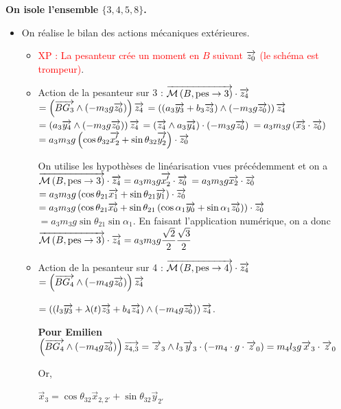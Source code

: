 \documentclass[10pt,fleqn]{article} %
\begin{document}
\textbf{On isole l'ensemble $\{3,4,5,8\}$.}


\begin{itemize}
\item On réalise le bilan des actions mécaniques extérieures. 
\begin{itemize}
\item \textcolor{red}{ XP : La pesanteur crée un moment en $B$ suivant  $\overrightarrow{z_0}$ (le schéma est trompeur)}.
\item Action de la pesanteur sur 3 : 
$\overrightarrow{\mathcal{M}\left( {B}, {\text{pes}} \rightarrow {3}\right)}\cdot \overrightarrow{z_4} $ $ =\left(\overrightarrow{BG_3}\wedge \left(-m_3g \overrightarrow{z_0}\right) \right)\overrightarrow{z_4}$ 
$ =\left(\left( a_3\overrightarrow{y_3} + b_3\overrightarrow{z_3}  \right)\wedge \left(-m_3g \overrightarrow{z_0}\right)\right)\overrightarrow{z_4}$
$ =\left( a_3\overrightarrow{y_4} \wedge \left(-m_3g \overrightarrow{z_0}\right)\right)\overrightarrow{z_4}$
$ =\left( \overrightarrow{z_4} \wedge a_3\overrightarrow{y_4}\right)\cdot  \left(-m_3g \overrightarrow{z_0}\right)$
$ = a_3 m_3g \left( \overrightarrow{x_3}\cdot \overrightarrow{z_0} \right)$
$ = a_3 m_3g \left(  \cos\theta_{32} \overrightarrow{x_2'} +\sin\theta_{32} \overrightarrow{y_2'} \right)\cdot \overrightarrow{z_0} $

On utilise les hypothèses de linéarisation vues précédemment et on a 
$\overrightarrow{\mathcal{M}\left( {B}, {\text{pes}} \rightarrow {3}\right)}\cdot \overrightarrow{z_4}= a_3 m_3g \overrightarrow{x_2'} \cdot \overrightarrow{z_0} $ 
$= a_3 m_3g \overrightarrow{x_2} \cdot \overrightarrow{z_0} $
$= a_3 m_3g \left( \cos \theta_{21} \overrightarrow{x_1} +\sin \theta_{21} \overrightarrow{y_1} \right)\cdot \overrightarrow{z_0} $
$= a_3 m_3g \left( \cos \theta_{21} \overrightarrow{x_0} +\sin \theta_{21}  \left( \cos \alpha_1 \overrightarrow{y_0} + \sin \alpha_1 \overrightarrow{z_0} \right) \right)\cdot \overrightarrow{z_0} $
$= a_3 m_3g \sin \theta_{21}   \sin \alpha_1    $. En faisant l'application numérique, on a donc 
$\overrightarrow{\mathcal{M}\left( {B}, {\text{pes}} \rightarrow {3}\right)}\cdot \overrightarrow{z_4}= a_3 m_3g  \dfrac{\sqrt{2}}{2} \dfrac{\sqrt{3}}{2}$

\item Action de la pesanteur sur 4 : 
$\overrightarrow{\mathcal{M}\left( {B}, {\text{pes}} \rightarrow {4}\right)}\cdot \overrightarrow{z_4} $ $ =\left(\overrightarrow{BG_4}\wedge \left(-m_4g \overrightarrow{z_0}\right) \right)\overrightarrow{z_4}$ 

$ =\left(\left(l_3\overrightarrow{y_3} + \lambda(t) \overrightarrow{z_3} + b_4\overrightarrow{z_4} \right)\wedge \left(-m_4g \overrightarrow{z_0}\right) \right)\overrightarrow{z_4}$. 

\textbf{Pour Emilien }
$
\left(\overrightarrow{BG_4}\wedge \left(-m_4g \overrightarrow{z_0}\right) \right)\overrightarrow{z_{4,3}}
=\overrightarrow{z}_3\wedge l_3\overrightarrow{y}_3\cdot \left(-m_4\cdot g\cdot \overrightarrow{z}_0\right)=m_4l_3g\overrightarrow{x}_3\cdot \overrightarrow{z}_0
$

Or,

$\overrightarrow{x}_3=\cos\theta_{32}\overrightarrow{x}_{2,2'}+\sin\theta_{32}\overrightarrow{y}_{2'}$


\end{itemize}
\end{itemize}
\end{document}
